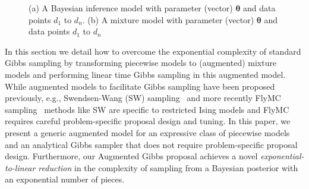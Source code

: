 \begin{figure}
\begin{subfigure}{.48\linewidth}
\caption{}
\label{fig:naive.mix}
\end{subfigure}
\vspace{-2mm}
\caption{\footnotesize 
(a) A Bayesian inference model with parameter (vector) $\boldsymbol\theta$ and data points $d_1$ to $d_n$.
(b) A mixture model with parameter (vector) $\boldsymbol\theta$ and data points $d_1$ to $d_n$ 
}
\vspace{-5mm}
\end{figure}

In this section we detail how to overcome the exponential complexity of standard Gibbs
sampling by transforming piecewise models to (augmented) mixture models and performing
linear time Gibbs sampling in this augmented model.  While augmented models to facilitate
Gibbs sampling have been proposed previously, e.g., Swendsen-Wang (SW) sampling~\cite{sw_mc} 
and more recently FlyMC sampling~\cite{fly_mc} methods like SW are specific to restricted
Ising models and FlyMC requires careful problem-specific proposal design and tuning.  In this paper,
we present a generic augmented model for an expressive class of piecewise models and
an analytical Gibbs sampler that does not require problem-specific proposal design.  
Furthermore, our Augmented Gibbs proposal achieves a novel \emph{exponential-to-linear reduction} in the complexity
of sampling from a Bayesian posterior with an exponential number of pieces.

